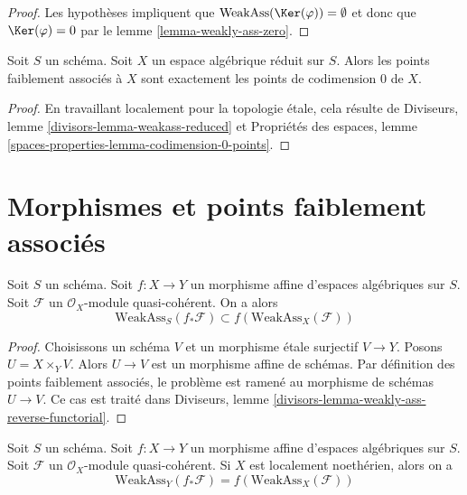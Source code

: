 \begin{proof}
Les hypothèses impliquent que $\text{WeakAss}(\Ker(\varphi)) = \emptyset$
et donc que $\Ker(\varphi) = 0$ par le lemme \ref{lemma-weakly-ass-zero}.
\end{proof}

\begin{lemma}
\label{lemma-weakass-reduced}
Soit $S$ un schéma. Soit $X$ un espace algébrique réduit sur $S$.
Alors les points faiblement associés à $X$ sont exactement les points de codimension $0$
de $X$.
\end{lemma}

\begin{proof}
En travaillant localement pour la topologie \'etale, cela résulte de
Diviseurs, lemme \ref{divisors-lemma-weakass-reduced}
et
Propriétés des espaces, lemme \ref{spaces-properties-lemma-codimension-0-points}.
\end{proof}










\section{Morphismes et points faiblement associés}
\label{section-morphisms-weakly-associated}

\begin{lemma}
\label{lemma-weakly-ass-reverse-functorial}
Soit $S$ un schéma.
Soit $f : X \to Y$ un morphisme affine d'espaces algébriques sur $S$.
Soit $\mathcal{F}$ un $\mathcal{O}_X$-module quasi-cohérent.
On a alors
$$
\text{WeakAss}_S(f_*\mathcal{F}) \subset f(\text{WeakAss}_X(\mathcal{F}))
$$
\end{lemma}

\begin{proof}
Choisissons un schéma $V$ et un morphisme \'etale surjectif $V \to Y$.
Posons $U = X \times_Y V$. Alors $U \to V$ est un morphisme affine
de schémas. Par définition des points faiblement associés,
le problème est ramené au morphisme de schémas $U \to V$. Ce cas est
traité dans Diviseurs, lemme \ref{divisors-lemma-weakly-ass-reverse-functorial}.
\end{proof}

\begin{lemma}
\label{lemma-ass-functorial-equal}
Soit $S$ un schéma.
Soit $f : X \to Y$ un morphisme affine d'espaces algébriques sur $S$.
Soit $\mathcal{F}$ un $\mathcal{O}_X$-module quasi-cohérent.
Si $X$ est localement noethérien, alors on a
$$
\text{WeakAss}_Y(f_*\mathcal{F}) =
f(\text{WeakAss}_X(\mathcal{F}))
$$
\end{lemma}

